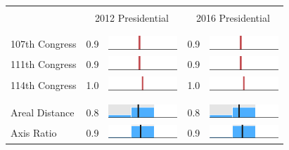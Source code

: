 
\begin{table}
\renewcommand{\arraystretch}{0.7}
 \begin{tabular}{l rm{7em} rm{7em}}
\hline \hline \\

{} & \multicolumn{2}{c}{2012 Presidential} & \multicolumn{2}{c}{2016 Presidential} \\

\\ \hline \\
107th Congress         &   0.9 &          \includegraphics[width=7em]{mini_hist/LA_2012_107} &   0.9 &          \includegraphics[width=7em]{mini_hist/LA_2016_107} \\
111th Congress         &   0.9 &          \includegraphics[width=7em]{mini_hist/LA_2012_111} &   0.9 &          \includegraphics[width=7em]{mini_hist/LA_2016_111} \\
114th Congress         &   1.0 &          \includegraphics[width=7em]{mini_hist/LA_2012_114} &   1.0 &          \includegraphics[width=7em]{mini_hist/LA_2016_114} \\
\\ \hline \\ 
Areal Distance         &   0.8 &       \includegraphics[width=7em]{mini_hist/LA_2012_dist_a} &   0.8 &       \includegraphics[width=7em]{mini_hist/LA_2016_dist_a} \\
Axis Ratio             &   0.9 &   \includegraphics[width=7em]{mini_hist/LA_2012_axis_ratio} &   0.9 &   \includegraphics[width=7em]{mini_hist/LA_2016_axis_ratio} \\

\end{tabular}
\end{table}
